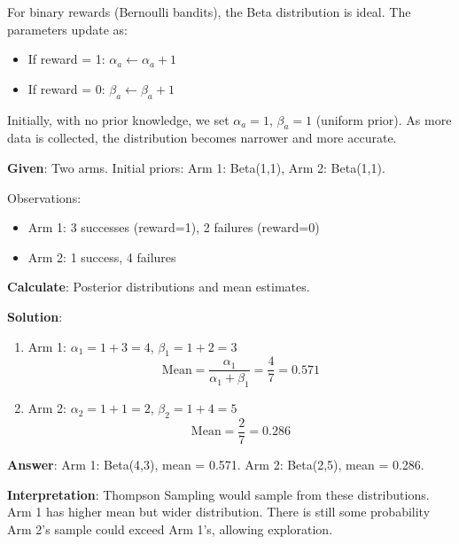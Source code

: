 \documentclass[11pt,a4paper]{article}
\begin{document}
For binary rewards (Bernoulli bandits), the Beta distribution is ideal. The parameters update as:
\begin{itemize}
    \item If reward = 1: $\alpha_a \leftarrow \alpha_a + 1$
    \item If reward = 0: $\beta_a \leftarrow \beta_a + 1$
\end{itemize}

Initially, with no prior knowledge, we set $\alpha_a = 1$, $\beta_a = 1$ (uniform prior). As more data is collected, the distribution becomes narrower and more accurate.

\begin{tcolorbox}[colback=blue!5!white,colframe=blue!75!black,title=\textbf{Worked Example 10: Thompson Sampling with Beta Updates}]
\textbf{Given}: Two arms. Initial priors: Arm 1: Beta(1,1), Arm 2: Beta(1,1).

Observations:
\begin{itemize}
    \item Arm 1: 3 successes (reward=1), 2 failures (reward=0)
    \item Arm 2: 1 success, 4 failures
\end{itemize}

\textbf{Calculate}: Posterior distributions and mean estimates.

\textbf{Solution}:
\begin{enumerate}
    \item Arm 1: $\alpha_1 = 1 + 3 = 4$, $\beta_1 = 1 + 2 = 3$
    \[
    \text{Mean} = \frac{\alpha_1}{\alpha_1 + \beta_1} = \frac{4}{7} = 0.571
    \]
    \item Arm 2: $\alpha_2 = 1 + 1 = 2$, $\beta_2 = 1 + 4 = 5$
    \[
    \text{Mean} = \frac{2}{7} = 0.286
    \]
\end{enumerate}

\textbf{Answer}: Arm 1: Beta(4,3), mean = 0.571. Arm 2: Beta(2,5), mean = 0.286.

\textbf{Interpretation}: Thompson Sampling would sample from these distributions. Arm 1 has higher mean but wider distribution. There is still some probability Arm 2's sample could exceed Arm 1's, allowing exploration.
\end{tcolorbox}
\end{document}
